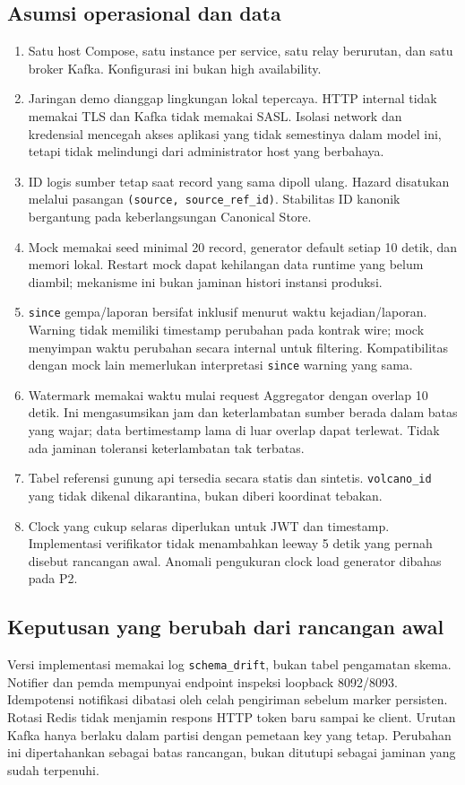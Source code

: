 \subsection{Asumsi operasional dan data}
\begin{enumerate}
\item Satu host Compose, satu instance per service, satu relay berurutan, dan satu broker Kafka. Konfigurasi ini bukan high availability.
\item Jaringan demo dianggap lingkungan lokal tepercaya. HTTP internal tidak memakai TLS dan Kafka tidak memakai SASL. Isolasi network dan kredensial mencegah akses aplikasi yang tidak semestinya dalam model ini, tetapi tidak melindungi dari administrator host yang berbahaya.
\item ID logis sumber tetap saat record yang sama dipoll ulang. Hazard disatukan melalui pasangan \texttt{(source, source\_ref\_id)}. Stabilitas ID kanonik bergantung pada keberlangsungan Canonical Store.
\item Mock memakai seed minimal 20 record, generator default setiap 10 detik, dan memori lokal. Restart mock dapat kehilangan data runtime yang belum diambil; mekanisme ini bukan jaminan histori instansi produksi.
\item \texttt{since} gempa/laporan bersifat inklusif menurut waktu kejadian/laporan. Warning tidak memiliki timestamp perubahan pada kontrak wire; mock menyimpan waktu perubahan secara internal untuk filtering. Kompatibilitas dengan mock lain memerlukan interpretasi \texttt{since} warning yang sama.
\item Watermark memakai waktu mulai request Aggregator dengan overlap 10 detik. Ini mengasumsikan jam dan keterlambatan sumber berada dalam batas yang wajar; data bertimestamp lama di luar overlap dapat terlewat. Tidak ada jaminan toleransi keterlambatan tak terbatas.
\item Tabel referensi gunung api tersedia secara statis dan sintetis. \texttt{volcano\_id} yang tidak dikenal dikarantina, bukan diberi koordinat tebakan.
\item Clock yang cukup selaras diperlukan untuk JWT dan timestamp. Implementasi verifikator tidak menambahkan leeway 5 detik yang pernah disebut rancangan awal. Anomali pengukuran clock load generator dibahas pada P2.
\end{enumerate}

\subsection{Keputusan yang berubah dari rancangan awal}
Versi implementasi memakai log \texttt{schema\_drift}, bukan tabel pengamatan skema. Notifier dan pemda mempunyai endpoint inspeksi loopback 8092/8093. Idempotensi notifikasi dibatasi oleh celah pengiriman sebelum marker persisten. Rotasi Redis tidak menjamin respons HTTP token baru sampai ke client. Urutan Kafka hanya berlaku dalam partisi dengan pemetaan key yang tetap. Perubahan ini dipertahankan sebagai batas rancangan, bukan ditutupi sebagai jaminan yang sudah terpenuhi.
